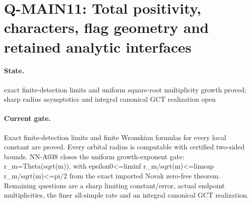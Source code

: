 \section{Q-MAIN11: Total positivity, characters, flag geometry and retained analytic interfaces}
\paragraph{State.} exact finite-detection limits and uniform square-root multiplicity growth proved; sharp radius asymptotics and integral canonical GCT realization open
\paragraph{Current gate.} Exact finite-detection limits and finite Wronskian formulas for every local constant are proved. Every orbital radius is computable with certified two-sided bounds. NN-A038 closes the uniform growth-exponent gate: r\_m=Theta(sqrt(m)), with epsilon0<=liminf r\_m/sqrt(m)<=limsup r\_m/sqrt(m)<=pi/2 from the exact imported Novak zero-free theorem. Remaining questions are a sharp limiting constant/error, actual endpoint multiplicities, the finer all-simple rate and an integral canonical GCT realization.

